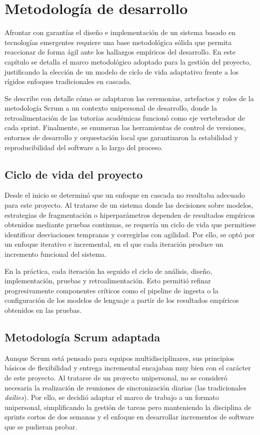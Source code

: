 \documentclass[12pt,a4paper,oneside]{report}
\begin{document}
\chapter{Metodología de desarrollo}

Afrontar con garantías el diseño e implementación de un sistema basado en tecnologías emergentes requiere una base metodológica sólida que permita reaccionar de forma ágil ante los hallazgos empíricos del desarrollo. En este capítulo se detalla el marco metodológico adoptado para la gestión del proyecto, justificando la elección de un modelo de ciclo de vida adaptativo frente a los rígidos enfoques tradicionales en cascada.

Se describe con detalle cómo se adaptaron las ceremonias, artefactos y roles de la metodología Scrum a un contexto unipersonal de desarrollo, donde la retroalimentación de las tutorías académicas funcionó como eje vertebrador de cada sprint. Finalmente, se enumeran las herramientas de control de versiones, entornos de desarrollo y orquestación local que garantizaron la estabilidad y reproducibilidad del software a lo largo del proceso.

\section{Ciclo de vida del proyecto}

Desde el inicio se determinó que un enfoque en cascada no resultaba adecuado para este proyecto. Al tratarse de un sistema donde las decisiones sobre modelos, estrategias de fragmentación o hiperparámetros dependen de resultados empíricos obtenidos mediante pruebas continuas, se requería un ciclo de vida que permitiese identificar desviaciones tempranas y corregirlas con agilidad. Por ello, se optó por un enfoque iterativo e incremental, en el que cada iteración produce un incremento funcional del sistema.

En la práctica, cada iteración ha seguido el ciclo de análisis, diseño, implementación, pruebas y retroalimentación. Esto permitió refinar progresivamente componentes críticos como el pipeline de ingesta o la configuración de los modelos de lenguaje a partir de los resultados empíricos obtenidos en las pruebas.

\section{Metodología Scrum adaptada}

Aunque Scrum está pensado para equipos multidisciplinares, sus principios básicos de flexibilidad y entrega incremental encajaban muy bien con el carácter de este proyecto. Al tratarse de un proyecto unipersonal, no se consideró necesaria la realización de reuniones de sincronización diarias (las tradicionales \textit{dailies}). Por ello, se decidió adaptar el marco de trabajo a un formato unipersonal, simplificando la gestión de tareas pero manteniendo la disciplina de sprints cortos de dos semanas y el enfoque en desarrollar incrementos de software que se pudieran probar.
\end{document}
